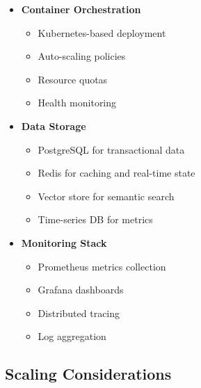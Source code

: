 \documentclass{article}
\begin{document}
\begin{itemize}
    \item \textbf{Container Orchestration}
    \begin{itemize}
        \item Kubernetes-based deployment
        \item Auto-scaling policies
        \item Resource quotas
        \item Health monitoring
    \end{itemize}
    
    \item \textbf{Data Storage}
    \begin{itemize}
        \item PostgreSQL for transactional data
        \item Redis for caching and real-time state
        \item Vector store for semantic search
        \item Time-series DB for metrics
    \end{itemize}
    
    \item \textbf{Monitoring Stack}
    \begin{itemize}
        \item Prometheus metrics collection
        \item Grafana dashboards
        \item Distributed tracing
        \item Log aggregation
    \end{itemize}
\end{itemize}

\subsection{Scaling Considerations}
\end{document}
